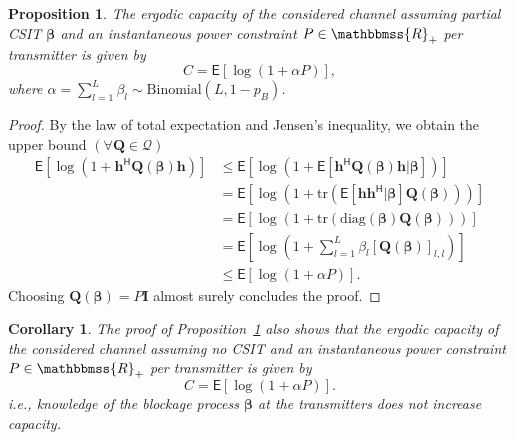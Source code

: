 \documentclass[10pt,journal,a4paper]{IEEEtran}
\newcommand{\E}{\mathsf{E}}		%
\newcommand{\stdset}[1]{\mathbbmss{#1}}	%
\newcommand{\set}[1]{\mathcal{#1}}		%
\renewcommand{\vec}[1]{\bm{#1}}		%
\newcommand{\herm}{\mathsf{H}}			%
\newtheorem{proposition}{Proposition}
\newtheorem{corollary}{Corollary}
\begin{document}
\begin{proposition}\label{prop:C}
The ergodic capacity of the considered channel assuming partial CSIT $\vec{\beta}$ and an instantaneous power constraint $P\in \stdset{R}_+$ per transmitter is given by
\begin{equation}\label{eq:C}
C = \E[\log(1+\alpha P)],
\end{equation}
where $\alpha = \sum_{l=1}^L\beta_l \sim \text{Binomial}(L,1-p_B)$.
\end{proposition}
\begin{proof}
By the law of total expectation and Jensen's inequality, we obtain the upper bound $(\forall \vec{Q}\in \set{Q})$
\begin{align*}
\E[\log(1+\vec{h}^\herm \vec{Q}(\vec{\beta}) \vec{h})] 
 & \leq \E[\log(1+\E[\vec{h}^\herm \vec{Q}(\vec{\beta}) \vec{h}|\vec{\beta}])] \\
 & = \E[\log(1+\mathrm{tr}(\E[\vec{h} \vec{h}^\herm  |\vec{\beta}]\vec{Q}(\vec{\beta})))] \\
 & = \E[\log(1+\mathrm{tr}(\mathrm{diag}(\vec{\beta})\vec{Q}(\vec{\beta})))] \\
 & = \E\left[\log\left(1+\sum_{l=1}^L\beta_l[\vec{Q}(\vec{\beta})]_{l,l}\right)\right] \\
 & \leq \E[\log(1+\alpha P)].
\end{align*}
Choosing $\vec{Q}(\vec{\beta})=P\vec{I}$ almost surely concludes the proof. 
\end{proof}
\begin{corollary}
The proof of Proposition~\ref{prop:C} also shows that the ergodic capacity of the considered channel assuming no CSIT and an instantaneous power constraint $P\in \stdset{R}_+$ per transmitter is given by
\begin{equation*}
C = \E[\log(1+\alpha P)].
\end{equation*}
i.e., knowledge of the blockage process $\vec{\beta}$ at the transmitters does not increase capacity.
\end{corollary}
\end{document}
